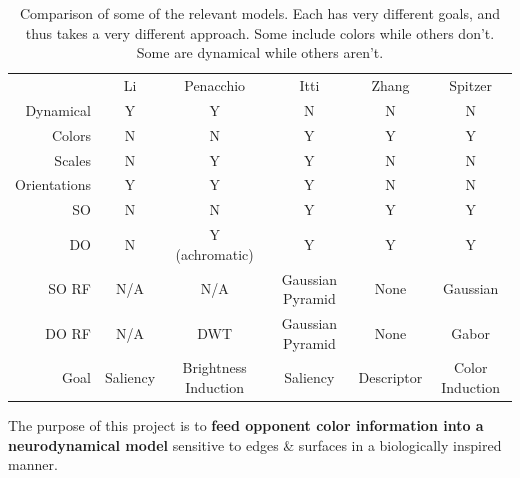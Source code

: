 \documentclass[journal,onecolumn]{IEEEtran}
\begin{document}
\begin{table}[h]
    \centering
    \begin{tabular}{rccccc}
        \multicolumn{1}{r|}{}                  & Li  & Penacchio                & Itti             & Zhang       & Spitzer  \\ \cline{1-6}
        \multicolumn{1}{r|}{Dynamical}        & Y   & Y                         & N                & N           & N        \\
        \multicolumn{1}{r|}{Colors}           & N   & N                         & Y                & Y           & Y        \\
        \multicolumn{1}{r|}{Scales}           & N   & Y                         & Y                & N           & N        \\
        \multicolumn{1}{r|}{Orientations}     & Y   & Y                         & Y                & N           & N        \\
        \multicolumn{1}{r|}{SO}               & N   & N                         & Y                & Y           & Y        \\
        \multicolumn{1}{r|}{DO}               & N   & Y (achromatic)            & Y                & Y           & Y        \\
        \multicolumn{1}{r|}{SO RF}            & N/A & N/A                       & Gaussian Pyramid & None        & Gaussian \\
        \multicolumn{1}{r|}{DO RF}            & N/A & DWT                       & Gaussian Pyramid & None        & Gabor    \\
        \multicolumn{1}{r|}{Goal}             & Saliency & Brightness Induction & Saliency         & Descriptor  & Color Induction
    \end{tabular}
    \caption{Comparison of some of the relevant models. Each has very different goals, and thus takes a very different approach. Some include colors while others don't. Some are dynamical while others aren't.}
    \label{tab:model-comparison}
\end{table}

The purpose of this project is to \textbf{feed opponent color information into a neurodynamical model} sensitive to edges \& surfaces in a biologically inspired manner.


%
%
%
\end{document}
